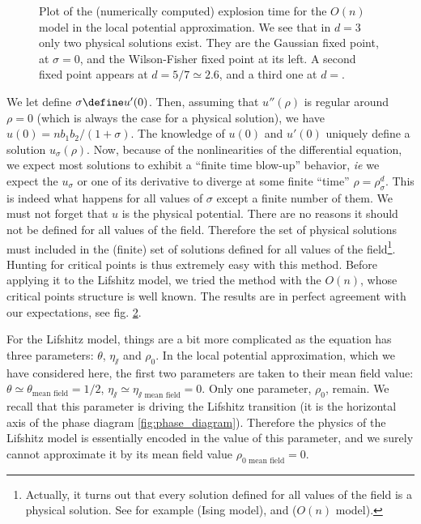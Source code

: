 \begin{figure}[htp]
\begin{subfigure}{.33\textwidth}
	\caption{}
	\label{on_d_2p4}
\end{subfigure}
\caption{Plot of the (numerically computed) explosion time for the $O(n)$ model in the local potential approximation. We see that in $d=3$ only two physical solutions exist. They are the Gaussian fixed point, at $\sigma = 0$, and the Wilson-Fisher fixed point at its left. A second fixed point appears at $d = 5/7 \simeq 2.6$, and a third one at $d= $.}
\label{fig:on_fp}
\end{figure}

We let  define $\sigma \define u'(0)$. Then, assuming that $u''(\rho)$ is regular around $\rho = 0$ (which is always the case for a physical solution), we have $u(0) = n b_1 b_2/(1+\sigma)$. The knowledge of $u(0)$ and $u'(0)$ uniquely define a solution $u_\sigma(\rho)$.
Now, because of the nonlinearities of the differential equation, we expect most solutions to exhibit a ``finite time blow-up'' behavior, \textit{ie} we expect the $u_\sigma$ or one of its derivative to diverge at some finite ``time'' $\rho = \rho_\sigma^d$.
This is indeed what happens for all values of $\sigma$ except a finite number of them. We must not forget that $u$ is the physical potential. There are no reasons it should not be defined for all values of the field. Therefore the set of physical solutions must included in the (finite) set of solutions defined for all values of the field\footnote{Actually, it turns out that every solution defined for all values of the field is a physical solution. See for example  \cite{CodelloIsing} (Ising model), and \cite{CodelloOn} ($O(n)$ model).}. 
Hunting for critical points is thus extremely easy with this method. Before applying it to the Lifshitz model, we tried the method with the $O(n)$, whose critical points structure is well known. The results are in perfect agreement with our expectations, see fig. \ref{fig:on_fp}. 

For the Lifshitz model, things are a bit more complicated as the equation has three parameters: $\theta$, $\eta_\sslash$ and $\rho_0$. In the local potential approximation, which we have considered here, the first two parameters are taken to their mean field value: $\theta \simeq \theta_{\text{mean field}} =  1/2$, $\eta_\sslash \simeq \eta_{\sslash\text{~mean field}} = 0$. Only one parameter, $\rho_0$, remain.
We recall that this parameter is driving the Lifshitz transition (it is the horizontal axis of the phase diagram \ref{fig:phase_diagram}). Therefore the physics of the Lifshitz model is essentially encoded in the value of this parameter, and we surely cannot approximate it by its mean field value $\rho_{0\text{~mean field}} = 0$.

